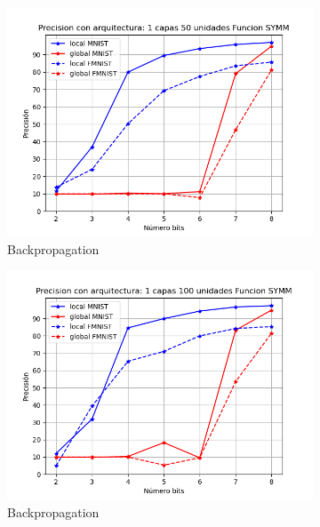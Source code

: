 \begin{figure}[H]
    \centering
    \begin{subfigure}[H]{0.475\textwidth}
    \includegraphics[width=\textwidth]{imagenes/backprop/Precision con arquitectura: 1 capas 50 unidades Funcion SYMM.png}
    \caption{Backpropagation}
    \end{subfigure}
    \begin{subfigure}[H]{0.475\textwidth}
    \includegraphics[width=\textwidth]{imagenes/backprop/Precision con arquitectura: 1 capas 100 unidades Funcion SYMM.png}
    \caption{Backpropagation}
    \end{subfigure}
    \begin{subfigure}[H]{0.475\textwidth}

\end{subfigure}
\end{figure}
